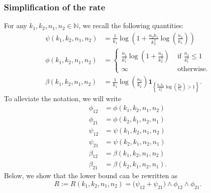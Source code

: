 \documentclass{article}
\begin{document}
\subsubsection{Simplification of the rate}
For any $k_1,k_2, n_1, n_2 \in \mathbb N$, we recall the following quantities:
\begin{align}
    \psi(k_1,k_2,n_1,n_2) &= \frac{1}{k_1} \log\left(1+ \frac{n_2k_1}{k_2^2} \log\left(\frac{n_1}{k_1}\right)\right) \label{eq_def_psi}\\[10pt]
    \phi(k_1,k_2, n_1,n_2) &= \begin{cases}
        \frac{n_1}{k_1^2} \log\left(1+\frac{n_2}{k_2^2}\right)&  \text{ if } \frac{n_1}{k_1^2} \leq 1\\
         \infty & \text{ otherwise.}
    \end{cases}\label{eq_def_phi}\\[10pt]
    \beta(k_1,k_2,n_1,n_2) &= \frac{1}{k_1} \log\left(\frac{n_2}{k_2}\right) \mathbf{1}_{\left\{\frac{n_1k_2}{k_1^2} \log\left(\frac{n_2}{k_2}\right)>1\right\}}.\label{eq_def_nu}
\end{align}
To alleviate the notation, we will write
\begin{align*}
    \phi_{12} &= \phi(k_1,k_2, n_1,n_2)\\
    \phi_{21} &= \phi(k_2,k_1, n_2,n_1)\\
    \psi_{12} &= \psi(k_1,k_2, n_1,n_2)\\
    \psi_{21} &= \psi(k_2,k_1, n_2,n_1)\\
    \beta_{12} &= \beta(k_1,k_2, n_1,n_2)\\
    \beta_{21} &= \beta(k_2,k_1, n_2,n_1).
\end{align*}
Below, we show that the lower bound can be rewritten as
\[R := R(k_1, k_2, n_1, n_2) = \Big(\psi_{12} + \psi_{21}\Big) \land \phi_{12}  \land \phi_{21}.\] 
\end{document}
